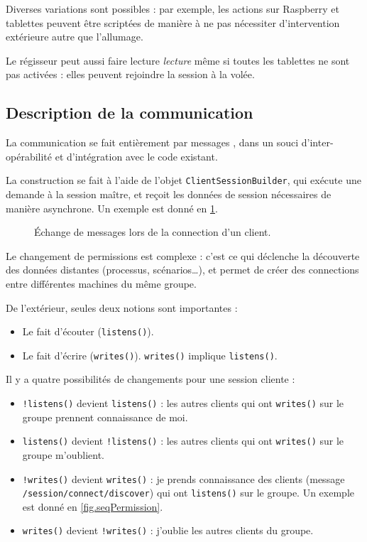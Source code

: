 Diverses variations sont possibles : par exemple, les actions sur Raspberry et tablettes peuvent être scriptées de manière à ne pas nécessiter d'intervention extérieure autre que l'allumage.

Le régisseur peut aussi faire lecture \textit{lecture} même si toutes les tablettes ne sont pas activées : elles peuvent rejoindre la session à la volée.

\subsection{Description de la communication}
La communication se fait entièrement par messages , dans un souci d'inter-opérabilité et d'intégration avec le code existant.

La construction se fait à l'aide de l'objet \texttt{ClientSessionBuilder}, qui exécute une demande à la session maître, et reçoit les données de session nécessaires de manière asynchrone.
Un exemple est donné en \cref{fig.connection}.

\begin{figure}[H]
	\centering
	
	\caption{Échange de messages lors de la connection d'un client.}
	\label{fig.connection}
\end{figure}

Le changement de permissions est complexe : c'est ce qui déclenche la découverte des données distantes (processus, scénarios\dots), et permet de créer des connections entre différentes machines du même groupe.

De l'extérieur, seules deux notions sont importantes : 
\begin{itemize}
	\item Le fait d'écouter (\texttt{listens()}).
	\item Le fait d'écrire (\texttt{writes()}). \texttt{writes()} implique \texttt{listens()}.
\end{itemize}

Il y a quatre possibilités de changements pour une session cliente : 
\begin{itemize}
	\item \texttt{!listens()} devient \texttt{listens()} : les autres clients qui ont \texttt{writes()} sur le groupe prennent connaissance de moi.
	\item \texttt{listens()} devient \texttt{!listens()} : les autres clients qui ont \texttt{writes()} sur le groupe m'oublient.
	\item \texttt{!writes()} devient \texttt{writes()} : je prends connaissance des clients (message \texttt{/session/connect/discover}) qui ont \texttt{listens()} sur le groupe. Un exemple est donné en \cref{fig.seqPermission}.
	\item \texttt{writes()} devient \texttt{!writes()} : j'oublie les autres clients du groupe.
\end{itemize}

